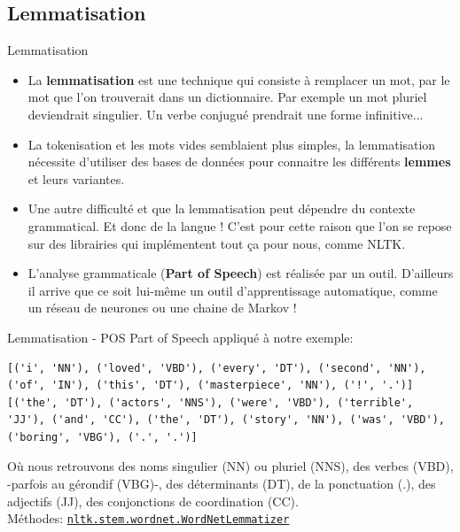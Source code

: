 \documentclass[10pt]{beamer}  %
\begin{document}
\subsection[Lemmatisation]{Lemmatisation}

\begin{frame}[fragile]{Lemmatisation}
	\begin{itemize}
		\item La \textbf{lemmatisation} est une technique qui consiste à remplacer un mot, par le mot que l'on trouverait dans un dictionnaire. Par exemple un mot pluriel deviendrait singulier. Un verbe conjugué prendrait une forme infinitive...
		\pause
		\item La tokenisation et les mots vides semblaient plus simples, la lemmatisation nécessite d'utiliser des bases de données pour connaitre les différents \textbf{lemmes} et leurs variantes.
		\pause
		\item Une autre difficulté et que la lemmatisation peut dépendre du contexte grammatical. Et donc de la langue ! C'est pour cette raison que l'on se repose sur des librairies qui implémentent tout ça pour nous, comme NLTK.
		\pause
		\item L'analyse grammaticale (\textbf{Part of Speech}) est réalisée par un outil. D'ailleurs il arrive que ce soit lui-même un outil d'apprentissage automatique, comme un réseau de neurones ou une chaine de Markov !
	\end{itemize}
\end{frame}

\begin{frame}[fragile]{Lemmatisation - POS}
	Part of Speech appliqué à notre exemple:
	\begin{lstlisting}
[('i', 'NN'), ('loved', 'VBD'), ('every', 'DT'), ('second', 'NN'), ('of', 'IN'), ('this', 'DT'), ('masterpiece', 'NN'), ('!', '.')]
[('the', 'DT'), ('actors', 'NNS'), ('were', 'VBD'), ('terrible', 'JJ'), ('and', 'CC'), ('the', 'DT'), ('story', 'NN'), ('was', 'VBD'), ('boring', 'VBG'), ('.', '.')]
	\end{lstlisting}
	Où nous retrouvons des noms singulier (NN) ou pluriel (NNS), des verbes (VBD), -parfois au gérondif (VBG)-, des déterminants (DT), de la ponctuation (.), des adjectifs (JJ), des conjonctions de coordination (CC). \\
	\vfill
	Méthodes: \href{https://www.nltk.org/api/nltk.stem.wordnet.html#nltk.stem.wordnet.WordNetLemmatizer}{\texttt{nltk.stem.wordnet.WordNetLemmatizer}}
\end{frame}
\end{document}
